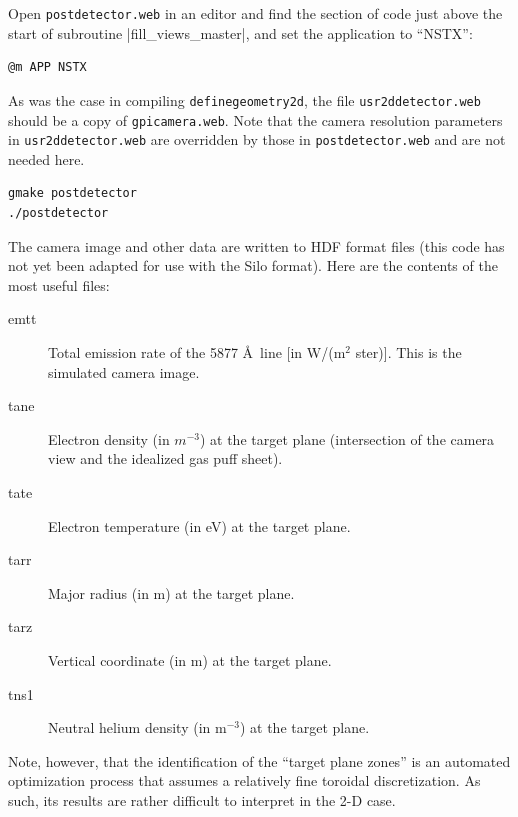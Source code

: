 \documentclass[12pt]{report}
\begin{document}
\begin{enumerate}
Open {\tt postdetector.web} in an editor and find the section of
code just above the start of subroutine |fill\_views\_master|, and
set the application to ``NSTX'':
\begin{verbatim}
@m APP NSTX
\end{verbatim}
As was the case in compiling {\tt definegeometry2d}, the file 
{\tt usr2ddetector.web}
should be a copy of {\tt gpicamera.web}.  Note that the camera resolution
parameters in {\tt usr2ddetector.web} 
are overridden by those in {\tt postdetector.web}
and are not needed here.
\begin{verbatim}
gmake postdetector
./postdetector
\end{verbatim}
The camera image and other data are written to HDF format files (this
code has not yet been adapted for use with the Silo format).  Here
are the contents of the most useful files:
\begin{description}
  \item[emtt] Total emission rate of the 5877 \AA\ line 
[in W/(m$^{2}$ ster)].  This is  the simulated camera image.
  \item[tane] Electron density (in $m^{-3}$) at the 
target plane (intersection of the camera
view and the idealized gas puff sheet).
  \item[tate] Electron temperature (in eV) at the target plane.
  \item[tarr] Major radius (in m) at the target plane.
  \item[tarz] Vertical coordinate (in m) at the target plane.
  \item[tns1] Neutral helium density (in m$^{-3}$) at the target plane.
\end{description}

Note, however, that the identification of the ``target plane zones'' is
an automated optimization process that assumes a relatively fine toroidal
discretization.  As such, its results are rather difficult to
interpret in the 2-D case.


\end{enumerate}
\end{document}
